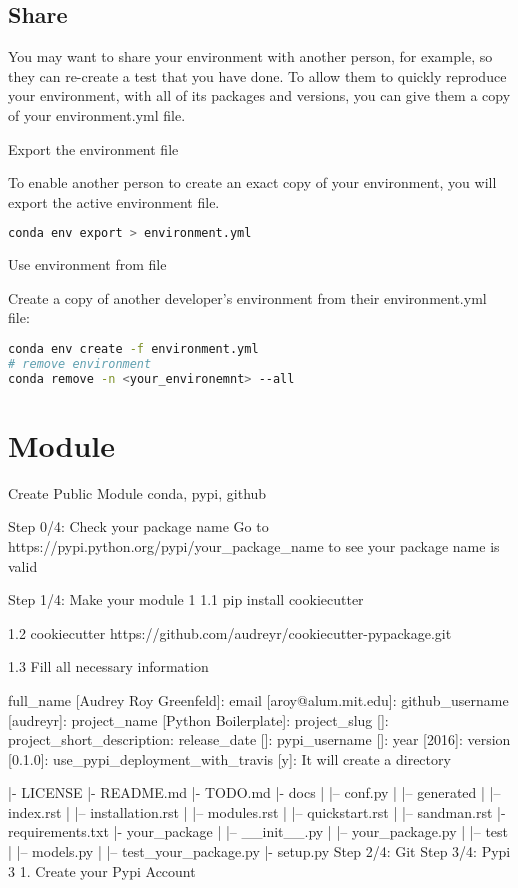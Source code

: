 \subsection{Share}

You may want to share your environment with another person, for example, so they can re-create a test that you have done. To allow them to quickly reproduce your environment, with all of its packages and versions, you can give them a copy of your environment.yml file.

Export the environment file

To enable another person to create an exact copy of your environment, you will export the active environment file.

\begin{lstlisting}[language=bash]
conda env export > environment.yml
\end{lstlisting}

Use environment from file

Create a copy of another developer's environment from their environment.yml file:

\begin{lstlisting}[language=bash]
conda env create -f environment.yml
# remove environment
conda remove -n <your_environemnt> --all
\end{lstlisting}



\section{Module}


Create Public Module
conda, pypi, github

Step 0/4: Check your package name
Go to https://pypi.python.org/pypi/your_package_name to see your package name is valid

Step 1/4: Make your module 1
1.1 pip install cookiecutter

1.2 cookiecutter https://github.com/audreyr/cookiecutter-pypackage.git

1.3 Fill all necessary information

full_name [Audrey Roy Greenfeld]:
email [aroy@alum.mit.edu]:
github_username [audreyr]:
project_name [Python Boilerplate]:
project_slug []:
project_short_description:
release_date []:
pypi_username []:
year [2016]:
version [0.1.0]:
use_pypi_deployment_with_travis [y]:
It will create a directory

|- LICENSE
|- README.md
|- TODO.md
|- docs
|   |-- conf.py
|   |-- generated
|   |-- index.rst
|   |-- installation.rst
|   |-- modules.rst
|   |-- quickstart.rst
|   |-- sandman.rst
|- requirements.txt
|- your_package
|   |-- __init__.py
|   |-- your_package.py
|   |-- test
|       |-- models.py
|       |-- test_your_package.py
|- setup.py
Step 2/4: Git
Step 3/4: Pypi 3
1. Create your Pypi Account

